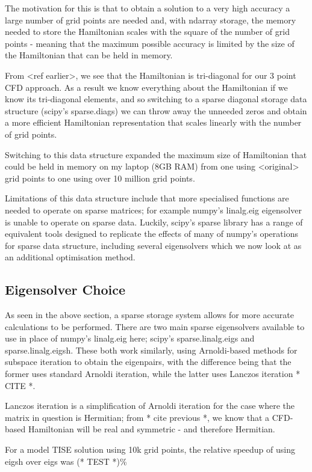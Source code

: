The motivation for this is that to obtain a solution to a very high accuracy a large number of grid points are needed and, with ndarray storage, the memory needed to store the Hamiltonian scales with the square of the number of grid points - meaning that the maximum possible accuracy is limited by the size of the Hamiltonian that can be held in memory. 

From <ref earlier>, we see that the Hamiltonian is tri-diagonal for our 3 point CFD approach. As a result we know everything about the Hamiltonian if we know its tri-diagonal elements, and so switching to a sparse diagonal storage data structure (scipy's sparse.diags) we can throw away the unneeded zeros and obtain a more efficient Hamiltonian representation that scales linearly with the number of grid points. 

Switching to this data structure expanded the maximum size of Hamiltonian that could be held in memory on my laptop (8GB RAM) from one using <original> grid points to one using over 10 million grid points.

Limitations of this data structure include that more specialised functions are needed to operate on sparse matrices; for example numpy's linalg.eig eigensolver is unable to operate on sparse data. Luckily, scipy's sparse library has a range of equivalent tools designed to replicate the effects of many of numpy's operations for sparse data structure, including several eigensolvers which we now look at as an additional optimisation method.

\subsection{Eigensolver Choice}
As seen in the above section, a sparse storage system allows for more accurate calculations to be performed. There are two main sparse eigensolvers available to use in place of numpy's linalg.eig here; scipy's sparse.linalg.eigs and sparse.linalg.eigsh. These both work similarly, using Arnoldi-based methods for subspace iteration to obtain the eigenpairs, with the difference being that the former uses standard Arnoldi iteration, while the latter uses Lanczos iteration * CITE *. 

Lanczos iteration is a simplification of Arnoldi iteration for the case where the matrix in question is Hermitian; from * cite previous *, we know that a CFD-based Hamiltonian will be real and symmetric - and therefore Hermitian. 

For a model TISE solution using 10k grid points, the relative speedup of using eigsh over eigs was (* TEST *)\%

